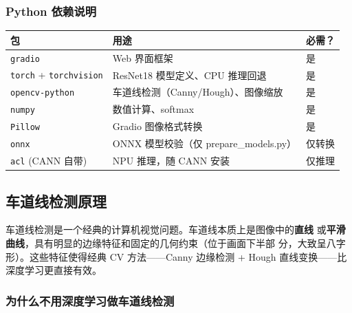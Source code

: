 \subsubsection{Python 依赖说明}\label{src-experiment-case6-h8}

\begin{longtable}[]{@{}lll@{}}
\toprule\noalign{}
包 & 用途 & 必需？ \\
\midrule\noalign{}
\endhead
\bottomrule\noalign{}
\endlastfoot
\passthrough{\lstinline!gradio!} & Web 界面框架 & 是 \\
\passthrough{\lstinline!torch!} + \passthrough{\lstinline!torchvision!}
& ResNet18 模型定义、CPU 推理回退 & 是 \\
\passthrough{\lstinline!opencv-python!} &
车道线检测（Canny/Hough）、图像缩放 & 是 \\
\passthrough{\lstinline!numpy!} & 数值计算、softmax & 是 \\
\passthrough{\lstinline!Pillow!} & Gradio 图像格式转换 & 是 \\
\passthrough{\lstinline!onnx!} & ONNX 模型校验（仅 prepare\_models.py）
& 仅转换 \\
\passthrough{\lstinline!acl!} (CANN 自带) & NPU 推理，随 CANN 安装 &
仅推理 \\
\end{longtable}

\subsection{车道线检测原理}\label{src-experiment-case6-h9}

车道线检测是一个经典的计算机视觉问题。车道线本质上是图像中的\textbf{直线}
或\textbf{平滑曲线}，具有明显的边缘特征和固定的几何约束（位于画面下半部
分，大致呈八字形）。这些特征使得经典 CV 方法------Canny 边缘检测 + Hough
直线变换------比深度学习更直接有效。

\subsubsection{为什么不用深度学习做车道线检测}\label{src-experiment-case6-h10}


